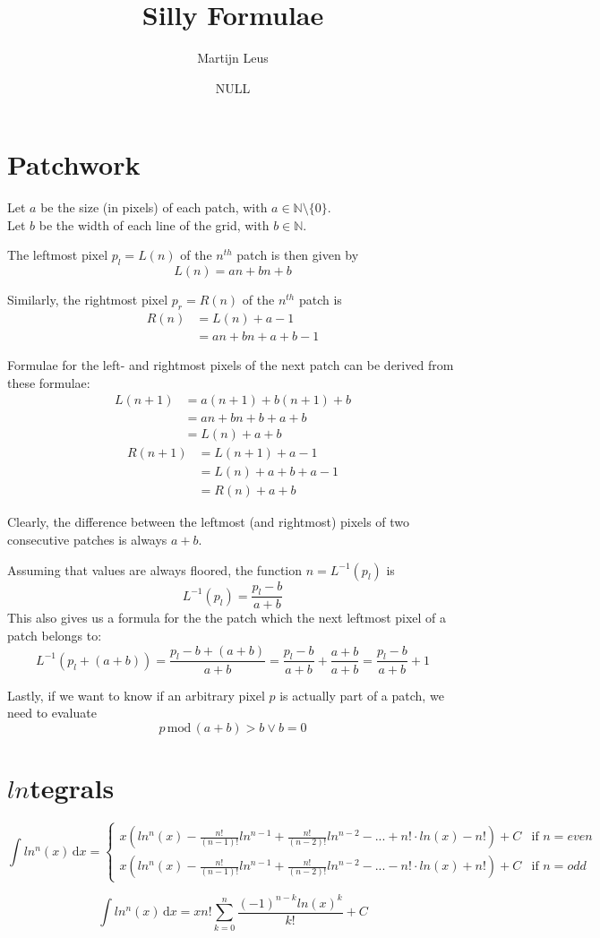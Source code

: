\documentclass{article}
\newcommand{\dif}[1]{\,\mathrm{d}#1}
\begin{document}
\title{Silly Formulae}
\author{Martijn Leus}
\date{NULL}

\maketitle

\section{Patchwork}

Let $a$ be the size (in pixels) of each patch, with $a\in\mathbb{N}\setminus\{0\}$.\\
Let $b$ be the width of each line of the grid, with $b\in\mathbb{N}$.

The leftmost pixel $p_l=L(n)$ of the $n^{th}$ patch is then given by
$$L(n)=an + bn + b$$

Similarly, the rightmost pixel  $p_r=R(n)$ of the $n^{th}$ patch is
\begin{align*}
	R(n) &= L(n) + a - 1 \\
	&= an + bn + a + b - 1
\end{align*}

Formulae for the left- and rightmost pixels of the next patch can be derived from these formulae:
\begin{align*}
	L(n+1) &=a(n+1) + b(n+1) + b \\
	&= an + bn + b + a + b \\
	&= L(n) + a + b
\end{align*}
\begin{align*}
	R(n+1) &=L(n+1) + a - 1 \\
	&= L(n) + a + b + a - 1 \\
	&= R(n) + a + b
\end{align*}

Clearly, the difference between the leftmost (and rightmost) pixels of two consecutive patches is always $a + b$.

Assuming that values are always floored, the function $n=L^{-1}(p_l)$ is
$$L^{-1}(p_l)={\frac{p_l-b}{a+b}}$$
This also gives us a formula for the the patch which the next leftmost pixel of a patch belongs to:
$$L^{-1}(p_l + (a + b))=\frac{p_l-b+(a+b)}{a+b}=\frac{p_l-b}{a+b}+\frac{a+b}{a+b}=\frac{p_l-b}{a+b}+1$$

Lastly, if we want to know if an arbitrary pixel $p$ is actually part of a patch, we need to evaluate
$$p\,\mathrm{mod}\,(a + b) > b \vee b = 0$$

\section{$ln$tegrals}
$$\int ln^n(x)\dif{x}=
\begin{cases}
x(ln^n(x)-\frac{n!}{(n-1)!}ln^{n-1}+\frac{n!}{(n-2)!}ln^{n-2}-...+n!\cdot ln(x)-n!)+C & \text{if } n=even \\ 
x(ln^n(x)-\frac{n!}{(n-1)!}ln^{n-1}+\frac{n!}{(n-2)!}ln^{n-2}-...-n!\cdot ln(x)+n!)+C & \text{if } n=odd
\end{cases}$$

$$\int ln^n(x)\dif{x}=xn!\sum_{k=0}^{n}\frac{(-1)^{n-k}ln(x)^k}{k!}+C$$
\end{document}

